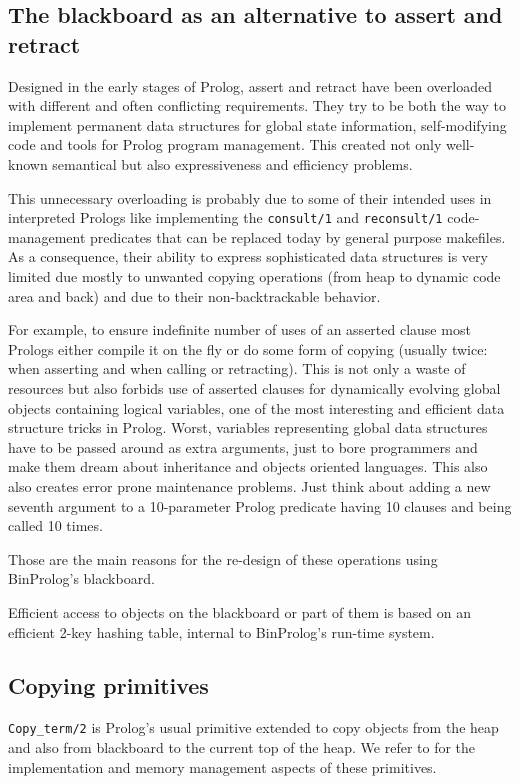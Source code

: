 \documentclass{article}
\begin{document}
\subsection{The blackboard as an alternative to assert and retract}

Designed in the early stages of Prolog, assert and retract have been
overloaded with different and often conflicting requirements. They try
to be both the way to implement permanent data structures for global
state information, self-modifying code
and tools for Prolog program management. This created
not only well-known semantical but also expressiveness and efficiency
problems.

This unnecessary overloading is probably due to some of their intended uses in interpreted Prologs like implementing the {\tt consult/1} and 
{\tt reconsult/1} code-management predicates that can be replaced today by general purpose makefiles. As a consequence, their ability to express sophisticated data structures is very limited due mostly to unwanted copying operations (from heap to dynamic code area and back) and due to their non-backtrackable behavior.

For example, to ensure indefinite number of uses of an asserted clause most Prologs either compile it on the fly or do some form of copying (usually twice: when asserting and when calling or retracting). This is not only a waste of resources but also forbids use of asserted clauses for dynamically evolving global objects containing logical variables, one of the most interesting and efficient data structure tricks in Prolog. Worst, variables representing global data structures have to be passed around as extra arguments, just to bore programmers and make them dream about 
inheritance and objects oriented languages.
This also also creates error prone maintenance problems. Just think about adding a new seventh argument to a 10-parameter Prolog predicate having 10 clauses and being called 10 times.

Those are the main
reasons for the re-design of these operations using
BinProlog's blackboard.

Efficient access to objects on the blackboard or part of them is based on an efficient 2-key hashing table, internal to BinProlog's run-time system.



\subsection{Copying primitives}
{\tt Copy\_term/2} is Prolog's usual primitive extended to copy objects from the heap and also from blackboard to the current top of the heap. We refer to
\cite{Tarau92:ECO} for the implementation and memory management aspects of
these primitives.
\end{document}
